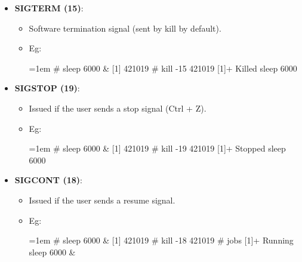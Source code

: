 \begin{flushleft}
\begin{itemize}
\begin{itemize}
\begin{itemize}
			\item \textbf{SIGTERM (15)}: 
			\begin{itemize}
				\item Software termination signal (sent by kill by default).
				\item Eg:
				\begin{tcolorbox}[breakable,notitle,boxrule=-0pt,colback=black,colframe=black]
					\color{green}
					\font=1em
					\# sleep 6000 \&
					\newline
					\color{white}
					[1] 421019
					\newline
					\newline
					\color{green}						
					\# kill -15 421019
					\newline
					\color{white}
					[1]+  Killed                  sleep 6000
					\font=4pt
				\end{tcolorbox}
			\end{itemize}
			\newpage
			\item \textbf{SIGSTOP (19)}: 
			\begin{itemize}
				\item Issued if the user sends a stop signal (Ctrl + Z).
				\item Eg:
				\begin{tcolorbox}[breakable,notitle,boxrule=-0pt,colback=black,colframe=black]
					\color{green}
					\fontdimen2\font=1em
					\# sleep 6000 \&
					\newline
					\color{white}
					[1] 421019
					\newline
					\newline
					\color{green}						
					\# kill -19 421019
					\newline
					\color{white}
					[1]+  Stopped                 sleep 6000
					\fontdimen2\font=4pt
				\end{tcolorbox}
			\end{itemize}

			\item \textbf{SIGCONT (18)}: 
			\begin{itemize}
				\item Issued if the user sends a resume signal.
				\item Eg:
				\begin{tcolorbox}[breakable,notitle,boxrule=-0pt,colback=black,colframe=black]
					\color{green}
					\font=1em
					\# sleep 6000 \&
					\newline
					\color{white}
					[1] 421019
					\newline
					\newline
					\color{green}						
					\# kill -18 421019
					\newline
					\# jobs
					\newline
					\color{white}
					[1]+  Running                 sleep 6000 \&
					\font=4pt
				\end{tcolorbox}
			\end{itemize}


\end{itemize}
\end{itemize}
\end{itemize}
\end{flushleft}
